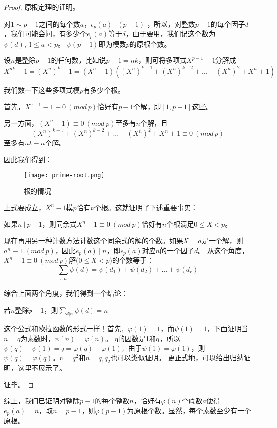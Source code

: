 \begin{proof}
	原根定理的证明。
	
	对$1\sim p-1$之间的每个数$a$，$e_p(a) \ | \ (p-1)$ ，所以，对整数$p-1$的每个因子$d$，我们可能会问，有多少个$e_p(a)$等于$d$，由于要用，我们记这个数为$\psi (d),\ 1\le a <p$。 
	$\psi(p-1)$即为模数$p$的原根个数。
	
	设$n$是整除$p-1$的任何数，比如说$p-1=nk$，则可将多项式$X^{p-1}-1$分解成$X^{nk}-1=(X^n)^k-1=(X^n-1)((X^n)^{k-1}+(X^n)^{k-2}+...+(X^n)^2+X^n+1)$
	
	我们数一下这些多项式模$p$有多少个根。
	
	首先，$X^{p-1}-1\equiv 0 \ (mod \ p)$恰好有$p-1$个解，即$[1,p-1]$这些。
	
	另一方面，$(X^n-1)\equiv 0 \ (mod \ p)$至多有$n$个解，且
	$$
	(X^n)^{k-1}+(X^n)^{k-2}+...+(X^n)^2+X^n+1 \equiv 0 \ (mod \ p)
	$$
	至多有$nk-n$个解。
	
	因此我们得到：
	\begin{figure}[htbp]
		\centering
		\texttt{[image: prime-root.png]}
		\caption{根的情况 \label{fig:prime-root}}
	\end{figure}

	上式要成立，$X^n-1$模$p$恰有$n$个根。这就证明了下述重要事实：
	
	{\heiti 如果$n \ | \ p-1$，则同余式$X^n-1\equiv 0 \ (mod \ p)$恰好有$n$个根满足$0\le X<p$。}
	
	现在再用另一种计数方法计数这个同余式的解的个数。如果$X=a$是一个解，则$a^n\equiv 1\ (mod \ p)$，因此$e_p(a)\ | \ n$，即$e_p(a)$对应$n$的一个因子$d$。
	从这个角度，$X^n-1\equiv 0 \ (mod \ p)$解($0\le X<p$)的个数等于：
	$$
		\sum_{d|n}\psi(d)=\psi(d_1)+\psi(d_2)+...+\psi(d_r)
	$$
	
	综合上面两个角度，我们得到一个结论：
	\begin{center}
	{\heiti 若$n$整除$p-1$，则$\sum_{d|n}\psi(d)=n$}
	\end{center}

	
	这个公式和欧拉函数的形式一样！首先，$\varphi(1)=1$，而$\psi(1)=1$，下面证明当$n=q$为素数时，$\psi(n)=\varphi(n)$。
	q的因数是1和q，所以$\psi(q)+\psi(1)=q=\varphi(q)+\varphi(1)$，由于$\psi(1)=\varphi(1)$，则$\psi(q)=\varphi(q)$。$n=q^2$和$n=q_1q_2$也可以类似证明。
	更正式地，可以给出归纳证明，这里不展示了。
	
	证毕。
\end{proof}

{\heiti 综上，我们已证明对整除$p-1$的每个整数$n$，恰好有$\varphi(n)$个底数$a$使得$e_p(a)=n$，取$n=p-1$，则$\varphi(p-1)$为原根个数。显然，每个素数至少有一个原根。}

